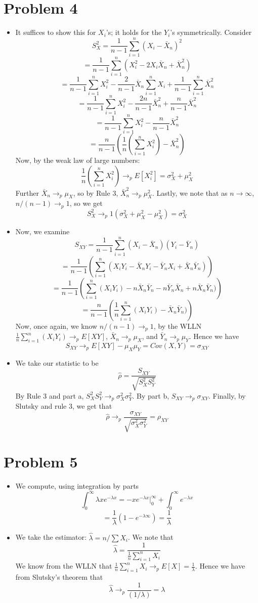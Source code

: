\documentclass[10pt,letter]{article}
\begin{document}
\section*{Problem 4}
\begin{itemize}
\item It suffices to show this for $X_i$'s; it holds for the $Y_i$'s symmetrically. Consider
\[ S^2_X = \frac{1}{n-1}\sum_{i=1}^n (X_i - \bar{X}_n)^2 \]
\[ = \frac{1}{n-1}\sum_{i=1}^n (X_i^2 - 2X_i\bar{X}_n + \bar{X}_n^2) \]
\[ = \frac{1}{n-1}\sum_{i=1}^n X_i^2 - \frac{2}{n-1}\bar{X}_n\sum_{i=1}^n X_i + \frac{1}{n-1}\sum_{i=1}^n \bar{X}_n^2 \]
\[ = \frac{1}{n-1}\sum_{i=1}^n X_i^2 - \frac{2n}{n-1}\bar{X}_n^2 + \frac{n}{n-1} \bar{X}_n^2 \]
\[ = \frac{1}{n-1}\sum_{i=1}^n X_i^2 - \frac{n}{n-1}\bar{X}_n^2  \]
\[ = \frac{n}{n-1}\left(\frac{1}{n}\left(\sum_{i=1}^n X_i^2\right) - \bar{X}_n^2 \right) \]
Now, by the weak law of large numbers:
\[ \frac{1}{n}\left(\sum_{i=1}^n X_i^2\right) \to_p E[X_i^2] = \sigma_X^2 + \mu_X^2 \]
Further $\bar{X}_n \to_p \mu_X$, so by Rule 3, $\bar{X}_n^2 \to_p \mu_X^2$. Lastly, we note that as $n\to\infty$, $n/(n-1) \to_p 1$, so we get
\[ S^2_X \to_p 1(\sigma_X^2 + \mu_X^2 - \mu_X^2) = \sigma_X^2 \]
\item Now, we examine
\[ S_{XY} = \frac{1}{n-1} \sum_{i=1}^n  (X_i - \bar{X}_n) (Y_i - \bar{Y}_n) \]
\[ = \frac{1}{n-1}\left( \sum_{i=1}^n  (X_iY_i - \bar{X}_n Y_i - \bar{Y}_nX_i +\bar{X}_n\bar{Y}_n ) \right) \]
\[ = \frac{1}{n-1}\left( \sum_{i=1}^n  (X_iY_i) - n \bar{X}_n \bar{Y}_n - n \bar{Y}_n\bar{X}_n + n\bar{X}_n\bar{Y}_n ) \right) \]
\[ = \frac{n}{n-1}\left( \frac{1}{n}\sum_{i=1}^n  (X_iY_i) - \bar{X}_n \bar{Y}_n ) \right) \]
Now, once again, we know $n/(n-1) \to_p 1$, by the WLLN $\frac{1}{n}\sum_{i=1}^n  (X_iY_i) \to_p E[XY]$, $\bar{X}_n \to_p \mu_X$, and $\bar{Y}_n \to_p \mu_Y$. Hence we have
\[ S_{XY} \to_p E[XY] - \mu_X \mu_Y = Cov(X,Y) = \sigma_{XY} \]
\item We take our statistic to be
\[ \hat{\rho} =  \frac{S_{XY}}{\sqrt{S_X^2S_Y^2}} \]
By Rule 3 and part a, $S_X^2 S_Y^2 \to_p \sigma_X^2 \sigma_Y^2$. By part b, $S_{XY} \to_p \sigma_{XY}$. Finally, by Slutsky and rule 3, we get that
\[ \hat{\rho} \to_p \frac{\sigma_{XY}}{\sqrt{\sigma^2_X \sigma^2_Y}} = \rho_{XY} \]
\end{itemize}
\section*{Problem 5}
\begin{itemize}
\item We compute, using integration by parts
\[ \int_0^\infty \lambda x e^{-\lambda x} = - x e^{-\lambda x} \Big|_0^\infty + \int_0^\infty e^{-\lambda x} \]
\[ = \frac{1}{\lambda} ( 1 - e^{-\lambda \infty}) = \frac{1}{\lambda} \]
\item We take the estimator: $\hat{\lambda} = n / \sum X_i$.
We note that
\[ \hat{\lambda} = \frac{1}{\frac{1}{n}\sum_{i=1}^n X_i } \]
We know from the WLLN that $\frac{1}{n}\sum_{i=1}^n X_i  \to_p E[X] = \frac{1}{\lambda}$. Hence we have from Slutsky's theorem that
\[ \hat{\lambda} \to_p \frac{1}{(1/\lambda)} = \lambda \]
\end{itemize}
\end{document}
